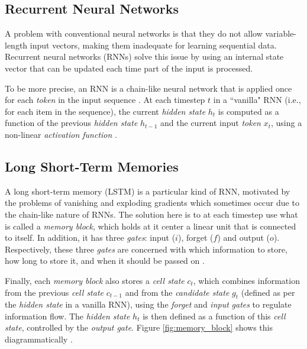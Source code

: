 \subsection{Recurrent Neural Networks}

A problem with conventional neural networks is that they do not allow variable-length input vectors, making them inadequate for learning sequential data. Recurrent neural networks (RNNs) solve this issue by using an internal state vector that can be updated each time part of the input is processed.

To be more precise, an RNN is a chain-like neural network that is applied once for each \textit{token} in the input sequence \cite{cho_learning_2014}. At each timestep $t$ in a ``vanilla" RNN (i.e., for each item in the sequence), the current \textit{hidden state} $h_t$ is computed as a function of the previous \textit{hidden state} $h_{t-1}$ and the current input \textit{token} $x_t$, using a non-linear \textit{activation function} \cite{cho_learning_2014}.

\subsection{Long Short-Term Memories}

A long short-term memory (LSTM) is a particular kind of RNN, motivated by the problems of vanishing and exploding gradients which sometimes occur due to the chain-like nature of RNNs. The solution here is to at each timestep use what is called a \textit{memory block}, which holds at it center a linear unit that is connected to itself. In addition, it has three \textit{gates}: input ($i$), forget ($f$) and output ($o$). Respectively, these three \textit{gates} are concerned with which information to store, how long to store it, and when it should be passed on \cite{gers_learning_2000}.

Finally, each \textit{memory block} also stores a \textit{cell state} $c_t$, which combines information from the previous \textit{cell state} $c_{t-1}$ and from the \textit{candidate state} $g_t$ (defined as per the \textit{hidden state} in a vanilla RNN), using the \textit{forget} and \textit{input} \textit{gates} to regulate information flow. The \textit{hidden state} $h_t$ is then defined as a function of this \textit{cell state}, controlled by the \textit{output gate}. Figure \ref{fig:memory_block} shows this diagrammatically \cite{graves_hybrid_2013}.

